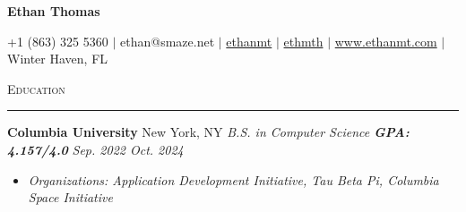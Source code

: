 \documentclass[11pt,letterpaper]{article}
\begin{document}
\centerline{\Huge\bf Ethan Thomas} 
\vspace{1pt}
\centerline{\small{\faMobile \space +1 (863) 325 5360 $|$ \faAt \space ethan@smaze.net $|$ \href{https://www.linkedin.com/in/ethanmt/}{\faLinkedinSquare \space ethanmt} $|$ \href{https://github.com/ethmth}{\faGithub \space ethmth} $|$ \href{https://www.ethanmt.com}{\faGlobe \space www.ethanmt.com} $|$ \faMapMarker \space Winter Haven, FL}}


\vspace{6pt}
\textsc{\large{Education}} 
\vspace{4pt}
\hrule
\begin{list}{}{\setlength{\leftmargin}{1em}\setlength{\rightmargin}{2pt}}
    \item
                
            \textbf{Columbia University} \hfill  {New York, NY}
            \vspace{2pt} \newline
            \small{\textit{B.S. in Computer Science \quad \textbf{GPA: 4.157/4.0}}} \hfill {\small{\textit{Sep. 2022 \textendash \space Oct. 2024}}}
            \vspace{0pt}
            \begin{itemize}[itemsep=-5pt, topsep=-2pt]
                \item \small{\textit{Organizations: Application Development Initiative, Tau Beta Pi, Columbia Space Initiative}}
            \end{itemize}
\end{list}

\end{document}
